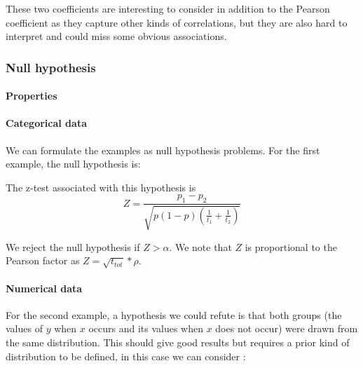 \documentclass[12pt,a4paper]{article}
\begin{document}
These two coefficients are interesting to consider in addition to the Pearson coefficient as they capture other kinds of correlations, but they are also hard to interpret and could miss some obvious associations.

\subsubsection{Null hypothesis}

\paragraph{Properties}


\paragraph{Categorical data}

We can formulate the examples as null hypothesis problems.
For the first example, the null hypothesis is:

\vspace{1em}
\medskip
\noindent
{}
\medskip

The z-test associated with this hypothesis is
$$Z = \frac{p_1-p_2}{\sqrt{p(1-p)\left(\frac{1}{t_1}+\frac{1}{t_2}\right)}}$$

We reject the null hypothesis if $Z > \alpha$. We note that $Z$ is proportional to the Pearson factor as $Z = \sqrt{t_{tot}}*\rho$. 

\paragraph{Numerical data}
For the second example, a hypothesis we could refute is that both groups (the values of $y$ when $x$ occurs and its values when $x$ does not occur) were drawn from the same distribution. This should give good results but requires a prior kind of distribution to be defined, in this case we can consider :

\vspace{1em}
\medskip
\noindent
{}
\medskip
\end{document}
